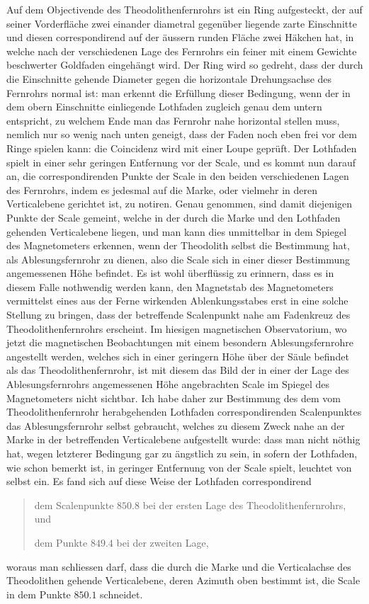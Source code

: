 Auf dem Objectivende des Theodolithenfernrohrs ist ein Ring aufgesteckt, der auf seiner Vorderfläche zwei einander diametral gegenüber liegende zarte Einschnitte und diesen correspondirend auf der äussern runden Fläche zwei Häkchen hat, in welche nach der verschiedenen Lage des Fernrohrs ein feiner mit einem Gewichte beschwerter Goldfaden eingehängt wird. Der Ring wird so gedreht, dass der durch die Einschnitte gehende Diameter gegen die horizontale Drehungsachse des Fernrohrs normal ist: man erkennt die Erfüllung dieser Bedingung, wenn der in dem obern Einschnitte einliegende Lothfaden zugleich genau dem untern entspricht, zu welchem Ende man das Fernrohr nahe horizontal stellen muss, nemlich nur so wenig nach unten geneigt, dass der Faden noch eben frei vor dem Ringe spielen kann: die Coincidenz wird mit einer Loupe geprüft. Der Lothfaden spielt in einer sehr geringen Entfernung vor der Scale, und es kommt nun darauf an, die correspondirenden Punkte der Scale in den beiden verschiedenen Lagen des Fernrohrs, indem es jedesmal auf die Marke, oder vielmehr in deren Verticalebene gerichtet ist, zu notiren. Genau genommen, sind damit diejenigen Punkte der Scale gemeint, welche in der durch die Marke und den Lothfaden gehenden Verticalebene liegen, und man kann dies unmittelbar in dem Spiegel des Magnetometers erkennen, wenn der Theodolith selbst die Bestimmung hat, als Ablesungsfernrohr zu dienen, also die Scale sich in einer dieser Bestimmung angemessenen Höhe befindet. Es ist wohl überflüssig zu erinnern, dass es in diesem Falle nothwendig werden kann, den Magnetstab
des Magnetometers vermittelst eines aus der Ferne wirkenden Ablenkungsstabes erst in eine solche Stellung zu bringen, dass der betreffende Scalenpunkt nahe am Fadenkreuz des Theodolithenfernrohrs erscheint. Im hiesigen magnetischen Observatorium, wo jetzt die magnetischen Beobachtungen mit einem besondern Ablesungsfernrohre angestellt werden, welches sich in einer geringern Höhe über der Säule befindet als das Theodolithenfernrohr, ist mit diesem das Bild der in einer der Lage des Ablesungsfernrohrs angemessenen Höhe angebrachten Scale im Spiegel des Magnetometers nicht sichtbar. Ich habe daher zur Bestimmung des dem vom Theodolithenfernrohr herabgehenden Lothfaden correspondirenden Scalenpunktes das Ablesungsfernrohr selbst gebraucht, welches zu diesem Zweck nahe an der Marke in der betreffenden Verticalebene aufgestellt wurde: dass man nicht nöthig hat, wegen letzterer Bedingung gar zu ängstlich zu sein, in sofern der Lothfaden, wie schon bemerkt ist, in geringer Entfernung von der Scale spielt, leuchtet von selbst ein. Es fand sich auf diese Weise der Lothfaden correspondirend
\begin{quote}
dem Scalenpunkte $850.8$ bei der ersten Lage des Theodolithenfernrohrs, und

 dem Punkte $849.4$ bei der zweiten Lage,
\end{quote}
woraus man schliessen darf, dass die durch die Marke und die Verticalachse des Theodolithen gehende Verticalebene, deren Azimuth oben bestimmt ist, die Scale in dem Punkte $850.1$ schneidet.

